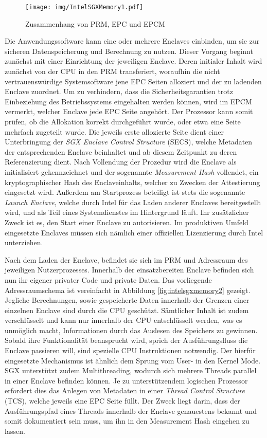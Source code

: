 \begin{figure}
	\texttt{[image: img/IntelSGXMemory1.pdf]}
	\centering
	\caption{Zusammenhang von PRM, EPC und EPCM}
	\label{fig:intelsgxmemory1}
\end{figure}

Die Anwendungssoftware kann eine oder mehrere Enclaves einbinden, um sie zur sicheren Datenspeicherung und Berechnung zu nutzen. Dieser Vorgang beginnt zunächst mit einer Einrichtung der jeweiligen Enclave. Deren initialer Inhalt wird zunächst von der CPU in den PRM transferiert, woraufhin die nicht vertrauenswürdige Systemsoftware jene EPC Seiten alloziert und der zu ladenden Enclave zuordnet. Um zu verhindern, dass die Sicherheitsgarantien trotz Einbeziehung des Betriebssystems eingehalten werden können, wird im EPCM vermerkt, welcher Enclave jede EPC Seite angehört. Der Prozessor kann somit prüfen, ob die Allokation korrekt durchgeführt wurde, oder etwa eine Seite mehrfach zugeteilt wurde. Die jeweils erste allozierte Seite dient einer Unterbringung der \textit{SGX Enclave Control Structure} (SECS), welche Metadaten der entsprechenden Enclave beinhaltet und ab diesem Zeitpunkt zu deren Referenzierung dient. Nach Vollendung der Prozedur wird die Enclave als initialisiert gekennzeichnet und der sogenannte \textit{Measurement Hash} vollendet, ein kryptographischer Hash des Enclaveinhalts, welcher zu Zwecken der Attestierung eingesetzt wird. Außerdem am Startprozess beteiligt ist stets die sogenannte \textit{Launch Enclave}, welche durch Intel für das Laden anderer Enclaves bereitgestellt wird, und als Teil eines Systemdienstes im Hintergrund läuft. Ihr zusätzlicher Zweck ist es, den Start einer Enclave zu autorisieren. Im produktiven Umfeld eingesetzte Enclaves müssen sich nämlich einer offiziellen Lizenzierung durch Intel unterziehen. 

Nach dem Laden der Enclave, befindet sie sich im PRM und Adressraum des jeweiligen Nutzerprozesses. Innerhalb der einsatzbereiten Enclave befinden sich nun ihr eigener privater Code und private Daten. Das vorliegende Adressraumschema ist vereinfacht in Abbildung \ref{fig:intelsgxmemory2} gezeigt. Jegliche Berechnungen, sowie gespeicherte Daten innerhalb der Grenzen einer einzelnen Enclave sind durch die CPU geschützt. Sämtlicher Inhalt ist zudem verschlüsselt und kann nur innerhalb der CPU entschlüsselt werden, was es unmöglich macht, Informationen durch das Auslesen des Speichers zu gewinnen. Sobald ihre Funktionalität beansprucht wird, sprich der Ausführungsfluss die Enclave passieren will, sind spezielle CPU Instruktionen notwendig. Der hierfür eingesetzte Mechanismus ist ähnlich dem Sprung vom User- in den Kernel Mode. SGX unterstützt zudem Multithreading, wodurch sich mehrere Threads parallel in einer Enclave befinden können. Je zu unterstützendem logischen Prozessor erfordert dies das Anlegen von Metadaten in einer \textit{Thread Control Structure} (TCS), welche jeweils eine EPC Seite füllt. Der Zweck liegt darin, dass der Ausführungspfad eines Threads innerhalb der Enclave genauestens bekannt und somit dokumentiert sein muss, um ihn in den Measurement Hash eingehen zu lassen.

